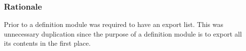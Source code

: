 \documentclass[10pt,a4paper]{article}
\begin{document}
\subsubsection{Rationale}
Prior to \cite{Wirth85} a definition module was required to have an export
list. This was unnecessary duplication since the purpose of a definition
module is to export all its contents in the first place. 



\printglossary[title=Definitions, toctitle=Definitions]




\end{document}

